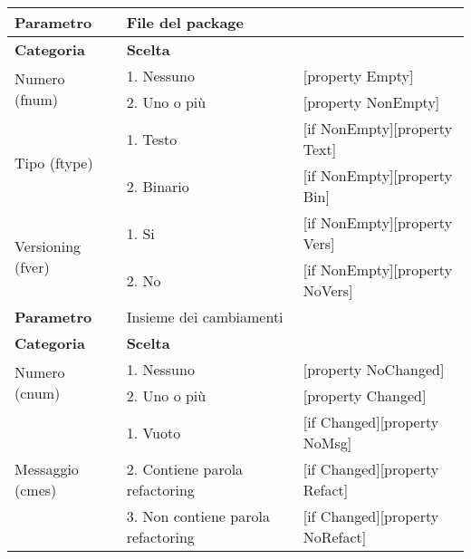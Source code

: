 			\begin{tabular}{|p{4cm}|p{4cm}p{5cm}|}
				\hline
				\cellcolor{Gray} \textbf{Parametro}		& File del package	&											\tabularnewline
				\hline
				\rowcolor{Gray}
				\textbf{Categoria} 						& \textbf{Scelta}			&									\tabularnewline
				\hline
				\multirow{2}{*}{Numero (fnum)} 			& 1. Nessuno 				&	[property Empty] 				\tabularnewline
				\cline{2-3}
														& 2. Uno o più				&	[property NonEmpty]				\tabularnewline
				\hline
				\multirow{2}{*}{Tipo (ftype)} 			& 1. Testo					&	[if NonEmpty][property Text] 	\tabularnewline
				\cline{2-3}
														& 2. Binario				&	[if NonEmpty][property Bin]		\tabularnewline
				\hline
				\multirow{2}{*}{Versioning (fver)}		& 1. Si						&	[if NonEmpty][property Vers]	\tabularnewline
				\cline{2-3}
														& 2. No						&	[if NonEmpty][property NoVers]	\tabularnewline
				\hline
				
				
				\cellcolor{Gray} \textbf{Parametro}		& Insieme dei cambiamenti	&									\tabularnewline
				\hline
				\rowcolor{Gray}
				\textbf{Categoria} 						& \textbf{Scelta}			&									\tabularnewline
				\hline
				\multirow{2}{*}{Numero (cnum)} 			& 1. Nessuno 				&	[property NoChanged]			\tabularnewline
				\cline{2-3}
														& 2. Uno o più				&	[property Changed]				\tabularnewline
				\hline
				\multirow{3}{*}{Messaggio (cmes)} 		& 1. Vuoto 					&	[if Changed][property NoMsg] 	\tabularnewline
				\cline{2-3}
														& 2. Contiene parola refactoring 		&	[if Changed][property Refact]		\tabularnewline
				\cline{2-3}
														& 3. Non contiene parola refactoring	&	[if Changed][property NoRefact]		\tabularnewline
				
				\hline			
				
			\end{tabular}

\vspace{1cm}


